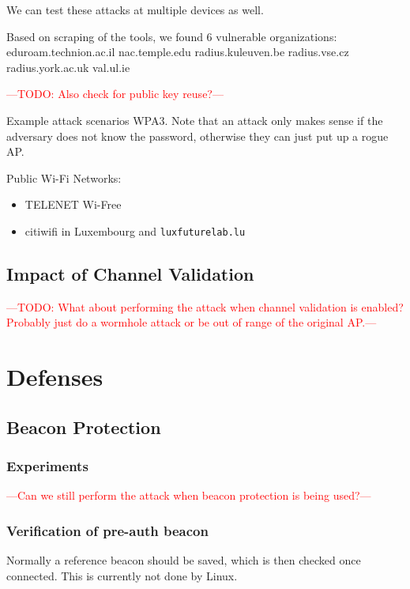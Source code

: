 \documentclass[sigconf,review]{acmart}
\newcommand{\wifi}{\mbox{Wi-Fi}}
\DeclareRobustCommand{\red}[1]{\textcolor{red}{#1}}
\begin{document}
We can test these attacks at multiple devices as well.

Based on scraping of the tools, we found 6 vulnerable organizations:
eduroam.technion.ac.il
nac.temple.edu
radius.kuleuven.be
radius.vse.cz
radius.york.ac.uk
val.ul.ie

\red{---TODO: Also check for public key reuse?---}

Example attack scenarios WPA3.
Note that an attack only makes sense if the adversary does not know the password, otherwise they can just put up a rogue AP.

Public \wifi{} Networks:

\begin{itemize}
	\item TELENET Wi-Free
	\item citiwifi in Luxembourg and \verb|luxfuturelab.lu|
\end{itemize}


\subsection{Impact of Channel Validation}

\red{---TODO: What about performing the attack when channel validation is enabled? Probably just do a wormhole attack or be out of range of the original AP.---}

\section{Defenses}
\label{sec:defenses}

\subsection{Beacon Protection}

\subsubsection{Experiments}

\red{---Can we still perform the attack when beacon protection is being used?---}

\subsubsection{Verification of pre-auth beacon}

Normally a reference beacon should be saved, which is then checked once connected.
This is currently not done by Linux.
\end{document}
